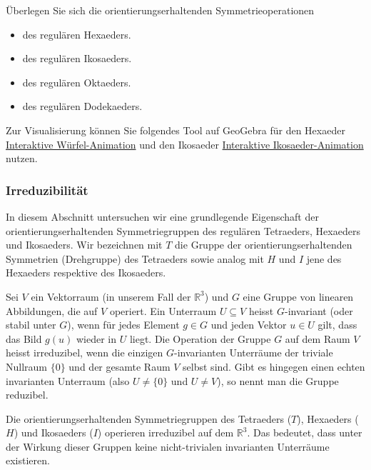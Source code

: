 \begin{exercise} \label{ex:hexaederikosaeder}
    Überlegen Sie sich die orientierungserhaltenden Symmetrieoperationen 
    \begin{itemize}
        \item[a)] des regulären Hexaeders.
        \item[b)] des regulären Ikosaeders.
        \item[c)] des regulären Oktaeders.
        \item[d)] des regulären Dodekaeders.
    \end{itemize} Zur Visualisierung können Sie folgendes Tool auf GeoGebra für den Hexaeder \href{https://www.geogebra.org/m/S97XG6v7}{Interaktive Würfel-Animation} \cite{geogebra_cube_symmetry} und den Ikosaeder \href{https://www.geogebra.org/m/PA7zzxHa}{Interaktive Ikosaeder-Animation} \cite{geogebra_icosahedron} nutzen.
\end{exercise}

\subsubsection{Irreduzibilität}
In diesem Abschnitt untersuchen wir eine grundlegende Eigenschaft der orientierungserhaltenden Symmetriegruppen des regulären Tetraeders, Hexaeders und Ikosaeders. Wir bezeichnen mit $T$ die Gruppe der orientierungserhaltenden Symmetrien (Drehgruppe) des Tetraeders sowie analog mit $H$ und $I$ jene des Hexaeders respektive des Ikosaeders.

\begin{definition}
Sei $V$ ein Vektorraum (in unserem Fall der $\mathbb{R}^3$) und $G$ eine Gruppe von linearen Abbildungen, die auf $V$ operiert. Ein Unterraum $U \subseteq V$ heisst $G$-invariant (oder stabil unter $G$), wenn für jedes Element $g \in G$ und jeden Vektor $u \in U$ gilt, dass das Bild $g(u)$ wieder in $U$ liegt. Die Operation der Gruppe $G$ auf dem Raum $V$ heisst irreduzibel, wenn die einzigen $G$-invarianten Unterräume der triviale Nullraum $\{0\}$ und der gesamte Raum $V$ selbst sind. Gibt es hingegen einen echten invarianten Unterraum (also $U \neq \{0\}$ und $U \neq V$), so nennt man die Gruppe reduzibel.
\end{definition}


\begin{lemma} \label{lemma:irreduzibelsymmetriegruppen}
    Die orientierungserhaltenden Symmetriegruppen des Tetraeders ($T$), Hexaeders ($H$) und Ikosaeders ($I$) operieren irreduzibel auf dem $\mathbb{R}^3$. Das bedeutet, dass unter der Wirkung dieser Gruppen keine nicht-trivialen invarianten Unterräume existieren.
\end{lemma}

